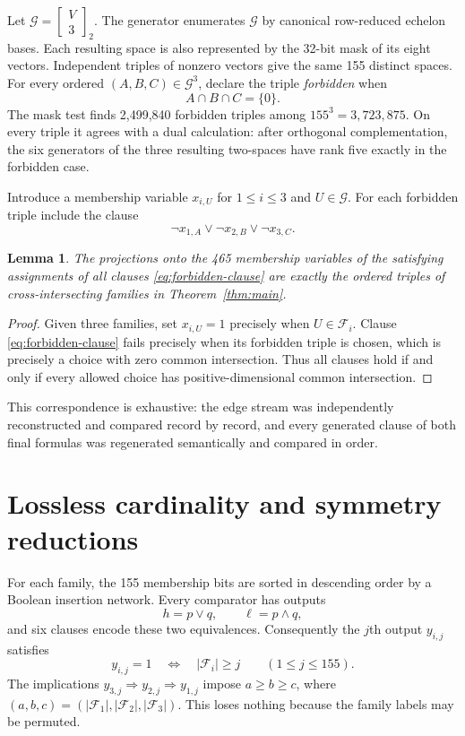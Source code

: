 \documentclass[11pt]{article}
\newtheorem{lemma}[theorem]{Lemma}
\newcommand{\cF}{\mathcal F}
\newcommand{\cG}{\mathcal G}
\begin{document}
Let $\cG=\left[\begin{smallmatrix}V\\3\end{smallmatrix}\right]_2$.  The generator enumerates $\cG$ by canonical
row-reduced echelon bases.  Each resulting space is also represented by the
32-bit mask of its eight vectors.  Independent triples of nonzero vectors
give the same 155 distinct spaces.  For every ordered
$(A,B,C)\in\cG^3$, declare the triple \emph{forbidden} when
\[
 A\cap B\cap C=\{0\}.
\]
The mask test finds 2,499,840 forbidden triples among
$155^3=3,723,875$.  On every triple it agrees with a dual calculation: after
orthogonal complementation, the six generators of the three resulting
two-spaces have rank five exactly in the forbidden case.

Introduce a membership variable $x_{i,U}$ for $1\leq i\leq3$ and
$U\in\cG$.  For each forbidden triple include the clause
\begin{equation}\label{eq:forbidden-clause}
  \lnot x_{1,A}\vee\lnot x_{2,B}\vee\lnot x_{3,C}.
\end{equation}

\begin{lemma}\label{lem:base}
The projections onto the 465 membership variables of the satisfying
assignments of all clauses \eqref{eq:forbidden-clause} are exactly the ordered
triples of cross-intersecting families in Theorem~\ref{thm:main}.
\end{lemma}

\begin{proof}
Given three families, set $x_{i,U}=1$ precisely when $U\in\cF_i$.  Clause
\eqref{eq:forbidden-clause} fails precisely when its forbidden triple is
chosen, which is precisely a choice with zero common intersection.  Thus all
clauses hold if and only if every allowed choice has positive-dimensional
common intersection.
\end{proof}

This correspondence is exhaustive: the edge stream was independently
reconstructed and compared record by record, and every generated clause of
both final formulas was regenerated semantically and compared in order.

\section{Lossless cardinality and symmetry reductions}

For each family, the 155 membership bits are sorted in descending order by a
Boolean insertion network.  Every comparator has outputs
\[
   h=p\vee q,\qquad \ell=p\wedge q,
\]
and six clauses encode these two equivalences.  Consequently the $j$th output
$y_{i,j}$ satisfies
\begin{equation}\label{eq:unary}
 y_{i,j}=1 \quad\Longleftrightarrow\quad |\cF_i|\geq j
 \qquad(1\leq j\leq155).
\end{equation}
The implications $y_{3,j}\Rightarrow y_{2,j}\Rightarrow y_{1,j}$ impose
$a\geq b\geq c$, where $(a,b,c)=(|\cF_1|,|\cF_2|,|\cF_3|)$.  This loses
nothing because the family labels may be permuted.
\end{document}
